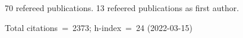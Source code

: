 70 refereed publications. 13 refeered publications as first author.

Total citations~=~2373; h-index~=~24 (2022-03-15)